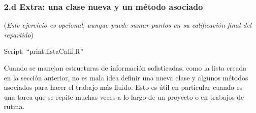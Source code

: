 \documentclass[]{article}
\newenvironment{Shaded}{}{}
\newcommand{\KeywordTok}[1]{\textcolor[rgb]{0.00,0.44,0.13}{\textbf{{#1}}}}
\newcommand{\DecValTok}[1]{\textcolor[rgb]{0.25,0.63,0.44}{{#1}}}
\newcommand{\FloatTok}[1]{\textcolor[rgb]{0.25,0.63,0.44}{{#1}}}
\newcommand{\StringTok}[1]{\textcolor[rgb]{0.25,0.44,0.63}{{#1}}}
\newcommand{\NormalTok}[1]{{#1}}
\begin{document}
\begin{Shaded}
\end{Shaded}
\subsubsection{2.d Extra: una clase nueva y un método asociado}

(\emph{Este ejercicio es opcional, aunque puede sumar puntos en su
calificación final del repartido})

Script: ``print.listaCalif.R''

Cuando se manejan estructuras de información sofisticadas, como la lista
creada en la sección anterior, no es mala idea definir una nueva clase y
algunos métodos asociados para hacer el trabajo más fluido. Esto es útil
en particular cuando es una tarea que se repite muchas veces a lo largo
de un proyecto o en trabajos de rutina.
\end{document}
